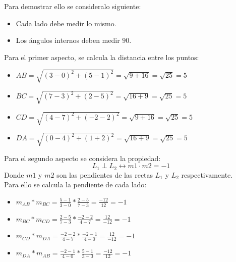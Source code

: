 \documentclass[11pt, a4paper]{article}
\begin{document}
Para demostrar ello se consideralo siguiente:
\begin{itemize}
    \item Cada lado debe medir lo mismo.
    \item Los ángulos internos deben medir $90$\textdegree.
\end{itemize}
Para el primer aspecto, se calcula la distancia entre los puntos:
\begin{itemize}
    \item $AB = \sqrt{(3-0)^2 + (5-1)^2} = \sqrt{9+16} = \sqrt{25} = 5$
    \item $BC = \sqrt{(7-3)^2 + (2-5)^2} = \sqrt{16+9} = \sqrt{25} = 5$
    \item $CD = \sqrt{(4-7)^2 + (-2-2)^2} = \sqrt{9+16} = \sqrt{25} = 5$
    \item $DA = \sqrt{(0-4)^2 + (1+2)^2} = \sqrt{16+9} = \sqrt{25} = 5$
\end{itemize}
Para el segundo aspecto se considera la propiedad:
\begin{equation*}
  L_1 \perp L_2 \leftrightarrow m1 \cdot m2 = -1
\end{equation*}
Donde $m1$ y $m2$ son las pendientes de las rectas $L_1$ y $L_2$ respectivamente.\\
Para ello se calcula la pendiente de cada lado:
\begin{itemize}
    \item $m_{AB} * m_{BC} = \frac{5-1}{3-0} * \frac{2-5}{7-3} = \frac{-12}{12} = -1$
    \item $m_{BC} * m_{CD} = \frac{2-5}{7-3} * \frac{-2-2}{4-7} = \frac{12}{-12} = -1$
    \item $m_{CD} * m_{DA} = \frac{-2-2}{4-7} * \frac{-2-1}{4-0} = \frac{12}{-12} = -1$
    \item $m_{DA} * m_{AB} = \frac{-2-1}{4-0} * \frac{5-1}{3-0} = \frac{-12}{12} = -1$
\end{itemize}
\end{document}
